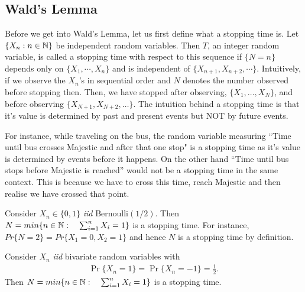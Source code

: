 \documentclass[a4paper,10pt, english]{article}
\begin{document}
\subsection{Wald's Lemma}
Before we get into Wald's Lemma, let us first define what a stopping time is.
	Let $\{X_n: n\in \mathbb{N}\}$ be independent random variables. Then $T$, an integer random variable, is called a stopping time with respect to this sequence if $\{N=n\}$ depends only on $\{X_1,\cdots,X_n\}$ and is independent of $\{X_{n+1}, X_{n+2},\cdots\}$. 
Intuitively, if we observe the $X_n$'s in sequential order and $N$ denotes the number observed before stopping then. Then, we have stopped after observing, $\{X_1, \ldots, X_N\}$, and before observing $\{X_{N+1}, X_{N+2}, \ldots\}$. 
The intuition behind a stopping time is that it's value is determined by past and present events but NOT by future events. 
\begin{exmp}
	For instance, while traveling on the bus, the random variable measuring ``Time until bus crosses Majestic and after that one stop" is a stopping time as it's value is determined by events before it happens. On the other hand ``Time until bus stops before Majestic is reached'' would not be a stopping time  in the same context. This is because we have to cross this time, reach Majestic and then realise we have crossed that point. 
\end{exmp}
\begin{exmp} Consider $X_n \in \{0,1\}$ \emph{iid} Bernoulli$(1/2)$. Then $N = min \{n \in \mathbb{N}:\quad \sum_{i=1}^n X_i = 1\}$ is a stopping time. For instance, $Pr\{N=2\} = Pr\{X_1=0,X_2=1\}$ and hence $ N $ is a stopping time by definition.
\end{exmp}
\begin{exmp} Consider $X_n$ \emph{iid} bivariate random variables with 
	\begin{align*}
	\Pr\{X_n = 1\} = \Pr\{X_n = -1\} = \frac{1}{2}. 
	\end{align*}
	Then $N = min \{n \in \mathbb{N}:\quad \sum_{i=1}^n X_i = 1\}$ is a stopping time.
\end{exmp}
\end{document}

